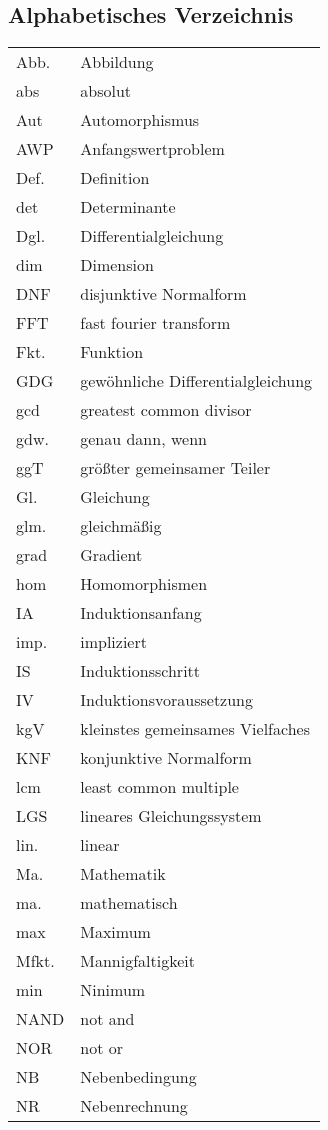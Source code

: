 \subsection{Alphabetisches Verzeichnis}
\begin{tabular}{ll}
Abb. & Abbildung\\
abs & absolut\\
Aut & Automorphismus\\
AWP & Anfangswertproblem\\
Def. & Definition\\
det & Determinante\\
Dgl. & Differentialgleichung\\
dim & Dimension\\
DNF & disjunktive Normalform\\
FFT & fast fourier transform\\
Fkt. & Funktion\\
GDG & gewöhnliche Differentialgleichung\\
gcd & greatest common divisor\\
gdw. & genau dann, wenn\\
ggT & größter gemeinsamer Teiler\\
Gl. & Gleichung\\
glm. & gleichmäßig\\
grad & Gradient\\
hom & Homomorphismen\\
IA & Induktionsanfang\\
imp. & impliziert\\
IS & Induktionsschritt\\
IV & Induktionsvoraussetzung\\
kgV & kleinstes gemeinsames Vielfaches\\
KNF & konjunktive Normalform\\
lcm & least common multiple\\
LGS & lineares Gleichungssystem\\
lin. & linear\\
Ma. & Mathematik\\
ma. & mathematisch\\
max & Maximum\\
Mfkt. & Mannigfaltigkeit\\
min & Ninimum\\
NAND & not and\\
NOR & not or\\
NB & Nebenbedingung\\
NR & Nebenrechnung\\

\end{tabular}
